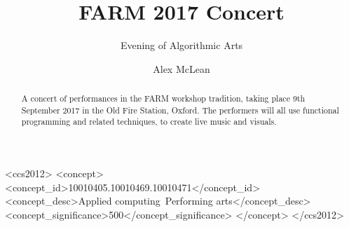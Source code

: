 \documentclass[sigplan,10pt,review]{acmart}\settopmatter{printfolios=true}
\begin{document}
\title[FARM 2017 Concert]{FARM 2017 Concert}         %
\subtitle{Evening of Algorithmic Arts}  %



\author{Alex McLean}

\begin{abstract}
A concert of performances in the FARM workshop tradition, taking place
9th September 2017 in the Old Fire Station, Oxford. The performers
will all use functional programming and related techniques, to create
live music and visuals.
\end{abstract}


\begin{CCSXML}
<ccs2012>
<concept>
<concept_id>10010405.10010469.10010471</concept_id>
<concept_desc>Applied computing~Performing arts</concept_desc>
<concept_significance>500</concept_significance>
</concept>
</ccs2012>
\end{CCSXML}

\end{document}
